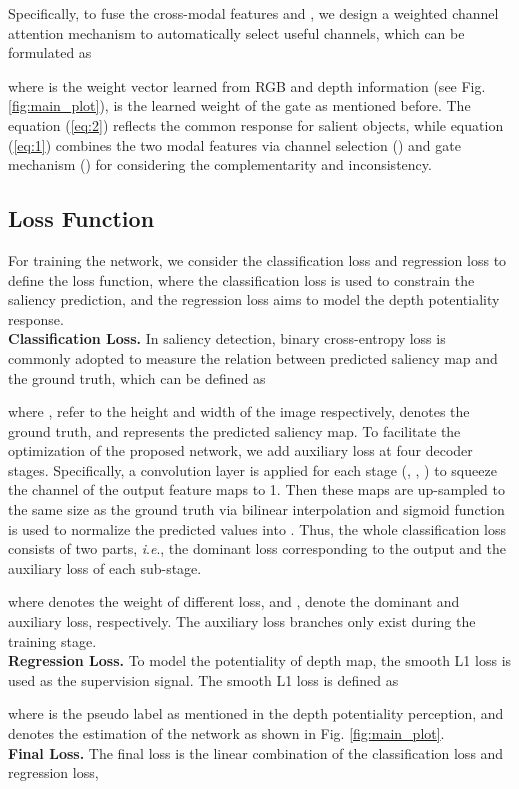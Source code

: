 \documentclass[journal]{IEEEtran}
\newcommand{\ie}{\textit{i}.\textit{e}.}
\begin{document}
Specifically, to fuse the cross-modal features  and , we design a weighted channel attention mechanism to automatically select useful channels, which can be formulated as

where  is the weight vector learned from RGB and depth information (see Fig. \ref{fig:main_plot}),  is the learned weight of the gate as mentioned before. The equation (\ref{eq:2}) reflects the common response for salient objects, while equation (\ref{eq:1}) combines the two modal features via channel selection () and gate mechanism () for considering the complementarity and inconsistency.



\subsection{Loss Function}
For training the network, we consider the classification loss and regression loss to define the loss function, where the classification loss is used to constrain the saliency prediction, and the regression loss aims to model the depth potentiality response. \\
\indent \textbf{Classification Loss.}
In saliency detection, binary cross-entropy loss is commonly adopted to measure the relation between predicted saliency map and the ground truth, which can be defined as

where ,  refer to the height and width of the image respectively,
 denotes the ground truth, and  represents the predicted saliency map. To facilitate the optimization of the proposed network, we add auxiliary loss at four decoder stages. Specifically, a  convolution layer is applied for each stage (, , ) to squeeze the channel of the output feature maps to 1. Then these maps are up-sampled to the same size as the ground truth via bilinear interpolation and sigmoid function is used to normalize the predicted values into . Thus, the whole classification loss consists of two parts, \ie, the dominant loss corresponding to the output and the auxiliary loss of each sub-stage.

where   denotes the weight of different loss, and ,
 denote the dominant and auxiliary loss, respectively. The auxiliary loss branches only exist during the training stage. \\
\indent\textbf{Regression Loss.} To model the potentiality of depth map, the smooth L1 loss \cite{girshick2015fast} is used as the supervision signal. The smooth L1 loss  is defined as

where  is the pseudo label as mentioned in the depth potentiality perception, and  denotes the estimation of the network as shown in Fig. \ref{fig:main_plot}. \\
\indent\textbf{Final Loss.} The final loss is the linear combination of the classification loss and regression loss,
\end{document}
